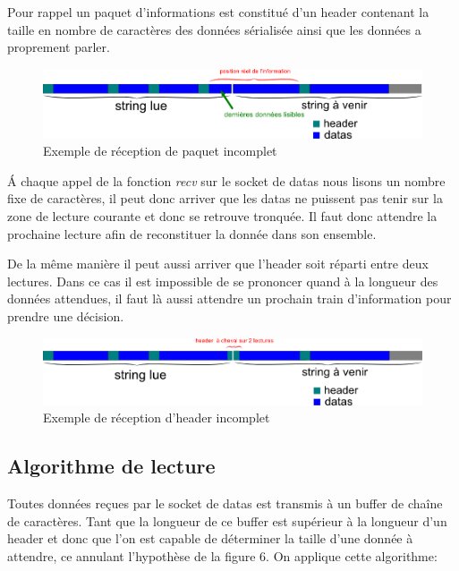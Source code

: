 Pour rappel un paquet d'informations est constitué d'un header contenant la taille en nombre de caractères des données sérialisée ainsi que les données a proprement parler.

\begin{figure}[h!]
	\centering 
	\includegraphics[scale=0.6]{images/uncomplete_packet.png}
	\caption{Exemple de réception de paquet incomplet}
\end{figure}

\'{A} chaque appel de la fonction \textit{recv} sur le socket de datas nous lisons un nombre fixe de caractères, il peut donc arriver que les datas ne puissent pas tenir sur la zone de lecture courante et donc se retrouve tronquée. Il faut donc attendre la prochaine lecture afin de reconstituer la donnée dans son ensemble.

De la même manière il peut aussi arriver que l'header soit réparti entre deux lectures. Dans ce cas il est impossible de se prononcer quand à la longueur des données attendues, il faut là aussi attendre un prochain train d'information pour prendre une décision.

\begin{figure}[h!]
	\centering 
	\includegraphics[scale=0.6]{images/uncomplete_header.png}
	\caption{Exemple de réception d'header incomplet}
\end{figure}
\newpage
\subsection*{Algorithme de lecture}

Toutes données reçues par le socket de datas est transmis à un buffer de chaîne de caractères. Tant que la longueur de ce buffer est supérieur à la longueur d'un header et donc que l'on est capable de déterminer la taille d'une donnée à attendre, ce annulant l'hypothèse de la figure 6. On applique cette algorithme:

